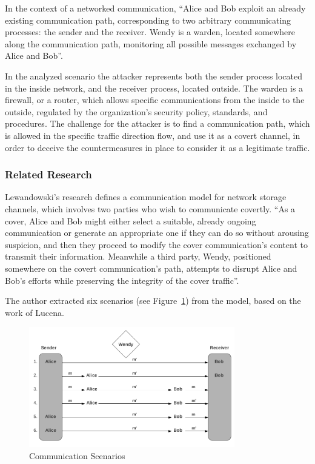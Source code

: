 \documentclass[12pt]{article}
\begin{document}
In the context of a networked communication, ``Alice and Bob exploit an already existing communication path, corresponding to two arbitrary communicating processes: the sender and the receiver. Wendy is a warden, located somewhere along the communication path, monitoring all possible messages exchanged by Alice and Bob''\cite{lewandowski}.

In the analyzed scenario the attacker represents both the sender process located in the inside network, and the receiver process, located outside. The warden is a firewall, or a router, which allows specific communications from the inside to the outside, regulated by the organization's security policy, standards, and procedures. The challenge for the attacker is to find a communication path, which is allowed in the specific traffic direction flow, and use it as a covert channel, in order to deceive the countermeasures in place to consider it as a legitimate traffic.




\subsubsection{Related Research}

Lewandowski's research defines a communication model for network storage channels, which involves two parties who wish to communicate covertly. ``As a cover, Alice and Bob might either select a suitable, already ongoing communication or generate an appropriate one if they can do so without arousing suspicion, and then they proceed to modify the cover communication’s content to transmit their information. Meanwhile a third party, Wendy, positioned somewhere on the covert communication’s path, attempts to disrupt Alice and Bob’s efforts while preserving the integrity of the cover traffic''\cite{lewandowski}.

The author extracted six scenarios (see Figure~\ref{fig:commScenarios}) from the model, based on the work of Lucena\cite{lucena}.

\begin{figure}[ht] 
\begin{center}
\includegraphics[width=0.8\textwidth]{communicationScenarios}
\caption{Communication Scenarios\cite{lewandowski}}
\label{fig:commScenarios}
\end{center}
\end{figure}
\end{document}

